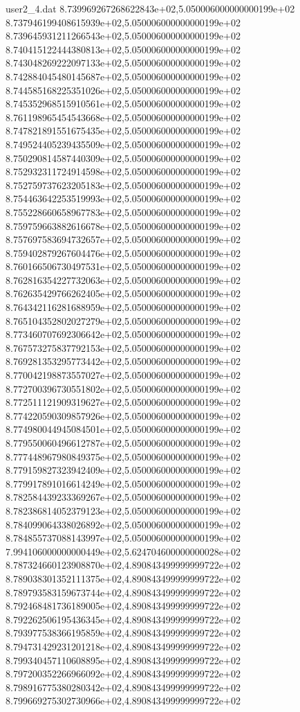 \begin{filecontents}{user2_4.dat}
8.739969267268622843e+02,5.050006000000000199e+02
8.737946199408615939e+02,5.050006000000000199e+02
8.739645931211266543e+02,5.050006000000000199e+02
8.740415122444380813e+02,5.050006000000000199e+02
8.743048269222097133e+02,5.050006000000000199e+02
8.742884045480145687e+02,5.050006000000000199e+02
8.744585168225351026e+02,5.050006000000000199e+02
8.745352968515910561e+02,5.050006000000000199e+02
8.761198965454543668e+02,5.050006000000000199e+02
8.747821891551675435e+02,5.050006000000000199e+02
8.749524405239435509e+02,5.050006000000000199e+02
8.750290814587440309e+02,5.050006000000000199e+02
8.752932311724914598e+02,5.050006000000000199e+02
8.752759737623205183e+02,5.050006000000000199e+02
8.754463642253519993e+02,5.050006000000000199e+02
8.755228660658967783e+02,5.050006000000000199e+02
8.759759663882616678e+02,5.050006000000000199e+02
8.757697583694732657e+02,5.050006000000000199e+02
8.759402879267604476e+02,5.050006000000000199e+02
8.760166506730497531e+02,5.050006000000000199e+02
8.762816354227732063e+02,5.050006000000000199e+02
8.762635429766262405e+02,5.050006000000000199e+02
8.764342116281688959e+02,5.050006000000000199e+02
8.765104352802027279e+02,5.050006000000000199e+02
8.773460707692306642e+02,5.050006000000000199e+02
8.767573275837792153e+02,5.050006000000000199e+02
8.769281353295773442e+02,5.050006000000000199e+02
8.770042198873557027e+02,5.050006000000000199e+02
8.772700396730551802e+02,5.050006000000000199e+02
8.772511121909319627e+02,5.050006000000000199e+02
8.774220590309857926e+02,5.050006000000000199e+02
8.774980044945084501e+02,5.050006000000000199e+02
8.779550060496612787e+02,5.050006000000000199e+02
8.777448967980849375e+02,5.050006000000000199e+02
8.779159827323942409e+02,5.050006000000000199e+02
8.779917891016614249e+02,5.050006000000000199e+02
8.782584439233369267e+02,5.050006000000000199e+02
8.782386814052379123e+02,5.050006000000000199e+02
8.784099064338026892e+02,5.050006000000000199e+02
8.784855737088143997e+02,5.050006000000000199e+02
7.994106000000000449e+02,5.624704600000000028e+02
8.787324660123908870e+02,4.890843499999999722e+02
8.789038301352111375e+02,4.890843499999999722e+02
8.789793583159673744e+02,4.890843499999999722e+02
8.792468481736189005e+02,4.890843499999999722e+02
8.792262506195436345e+02,4.890843499999999722e+02
8.793977538366195859e+02,4.890843499999999722e+02
8.794731429231201218e+02,4.890843499999999722e+02
8.799340457110608895e+02,4.890843499999999722e+02
8.797200352266966092e+02,4.890843499999999722e+02
8.798916775380280342e+02,4.890843499999999722e+02
8.799669275302730966e+02,4.890843499999999722e+02

\end{filecontents}
